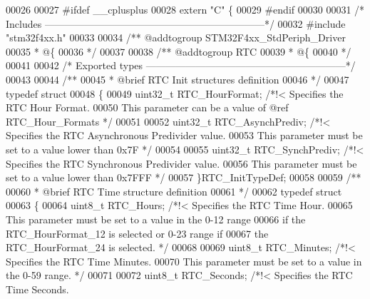 \begin{DoxyCode}
00026 
00027 \textcolor{preprocessor}{#}\textcolor{preprocessor}{ifdef} \_\_cplusplus
00028  \textcolor{keyword}{extern} \textcolor{stringliteral}{"C"} \{
00029 \textcolor{preprocessor}{#}\textcolor{preprocessor}{endif}
00030 
00031 \textcolor{comment}{/* Includes ------------------------------------------------------------------*/}
00032 \textcolor{preprocessor}{#}\textcolor{preprocessor}{include} "stm32f4xx.h"
00033 
00034 \textcolor{comment}{/** @addtogroup STM32F4xx\_StdPeriph\_Driver}
00035 \textcolor{comment}{  * @\{}
00036 \textcolor{comment}{  */}
00037 
00038 \textcolor{comment}{/** @addtogroup RTC}
00039 \textcolor{comment}{  * @\{}
00040 \textcolor{comment}{  */}
00041 
00042 \textcolor{comment}{/* Exported types ------------------------------------------------------------*/}
00043 
00044 \textcolor{comment}{/** }
00045 \textcolor{comment}{  * @brief  RTC Init structures definition  }
00046 \textcolor{comment}{  */}
00047 \textcolor{keyword}{typedef} \textcolor{keyword}{struct}
00048 \{
00049   uint32\_t RTC_HourFormat;   \textcolor{comment}{/*!< Specifies the RTC Hour Format.}
00050 \textcolor{comment}{                             This parameter can be a value of @ref RTC\_Hour\_Formats */}
00051 
00052   uint32\_t RTC_AsynchPrediv; \textcolor{comment}{/*!< Specifies the RTC Asynchronous Predivider value.}
00053 \textcolor{comment}{                             This parameter must be set to a value lower than 0x7F */}
00054 
00055   uint32\_t RTC_SynchPrediv;  \textcolor{comment}{/*!< Specifies the RTC Synchronous Predivider value.}
00056 \textcolor{comment}{                             This parameter must be set to a value lower than 0x7FFF */}
00057 \}RTC\_InitTypeDef;
00058 
00059 \textcolor{comment}{/** }
00060 \textcolor{comment}{  * @brief  RTC Time structure definition  }
00061 \textcolor{comment}{  */}
00062 \textcolor{keyword}{typedef} \textcolor{keyword}{struct}
00063 \{
00064   uint8\_t RTC_Hours;    \textcolor{comment}{/*!< Specifies the RTC Time Hour.}
00065 \textcolor{comment}{                        This parameter must be set to a value in the 0-12 range}
00066 \textcolor{comment}{                        if the RTC\_HourFormat\_12 is selected or 0-23 range if}
00067 \textcolor{comment}{                        the RTC\_HourFormat\_24 is selected. */}
00068 
00069   uint8\_t RTC_Minutes;  \textcolor{comment}{/*!< Specifies the RTC Time Minutes.}
00070 \textcolor{comment}{                        This parameter must be set to a value in the 0-59 range. */}
00071 
00072   uint8\_t RTC_Seconds;  \textcolor{comment}{/*!< Specifies the RTC Time Seconds.}

\end{DoxyCode}
